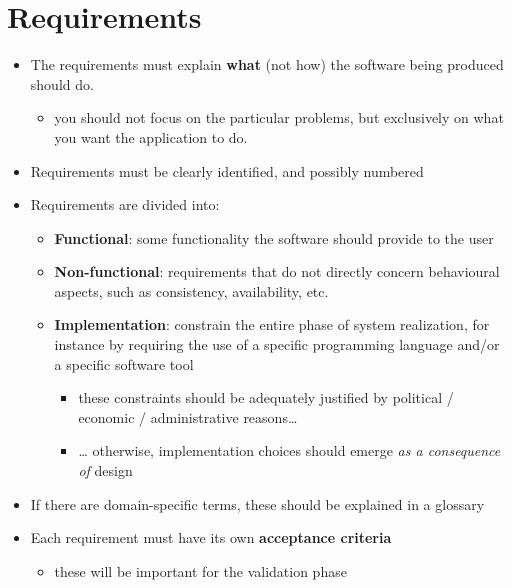 \documentclass{scrartcl}
\begin{document}
\section{Requirements}\label{requirements}

\begin{itemize}
  \item The requirements must explain \textbf{what} (not how) the software
  being produced should do.

  \begin{itemize}
    \item you should not focus on the particular problems, but exclusively on
    what you want the application to do.
  \end{itemize}
  \item Requirements must be clearly identified, and possibly numbered
  \item Requirements are divided into:

  \begin{itemize}
    \item \textbf{Functional}: some functionality the software should provide
    to the user
    \item \textbf{Non-functional}: requirements that do not directly concern
    behavioural aspects, such as consistency, availability, etc.
    \item \textbf{Implementation}: constrain the entire phase of system
    realization, for instance by requiring the use of a specific
    programming language and/or a specific software tool

    \begin{itemize}
      \item these constraints should be adequately justified by political /
      economic / administrative reasons\ldots{}
      \item \ldots{} otherwise, implementation choices should emerge \emph{as
      a consequence of} design
    \end{itemize}
  \end{itemize}
  \item If there are domain-specific terms, these should be explained in a
  glossary
  \item Each requirement must have its own \textbf{acceptance criteria}

  \begin{itemize}
    \item these will be important for the validation phase
  \end{itemize}
\end{itemize}
\end{document}
